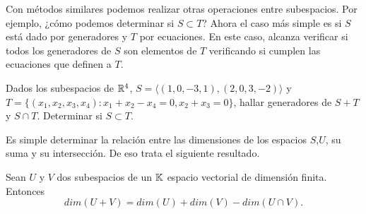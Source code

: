 Con métodos similares podemos realizar otras operaciones entre subespacios. Por ejemplo, ¿cómo podemos determinar si $S \subset T$? Ahora el caso más simple es si $S$ está dado por generadores y $T$ por ecuaciones. En este caso, alcanza verificar si todos los generadores de $S$ son elementos de $T$ verificando si cumplen las ecuaciones que definen a $T$.

\begin{ejercicio}
Dados los subespacios de $\mathbb R^4$, $S = \langle (1, 0, -3, 1), (2, 0, 3, -2)\rangle$ y $T = \{(x_1, x_2, x_3, x_4): x_1+x_2-x_4 = 0, x_2 + x_3 = 0\}$, hallar generadores de $S+T$ y $S \cap T$. Determinar si $S \subset T$.
\end{ejercicio}
Es simple determinar la relación entre las dimensiones de los espacios $S$,$U$, su suma y su intersección. De eso trata el siguiente resultado.
\begin{proposicion}\label{prop:dimsum}
Sean $U$ y $V$ dos subespacios de un $\mathbb K$ espacio vectorial de dimensión finita. Entonces
$$
dim(U+ V)=dim(U)+dim(V)-dim(U\cap V).
$$
\end{proposicion}
